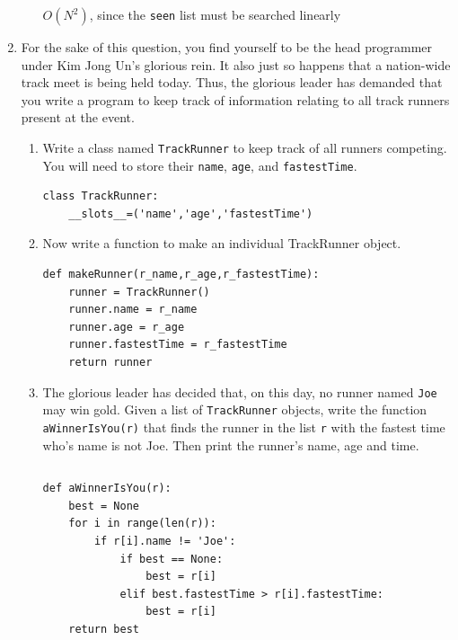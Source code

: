 \documentclass[11pt]{article}
\newenvironment{answer}{\large\lstset{basicstyle=\large}\color{white}}{}
\newenvironment{answer}{\large\lstset{basicstyle=\large}\color{red}}{}
\begin{document}
\begin{enumerate}
\begin{enumerate}
\begin{answer}
$O(N^2)$, since the \texttt{seen} list must be searched linearly
\end{answer}
\end{enumerate}

\newpage
\item For the sake of this question, you find yourself to be the head programmer under Kim Jong Un's glorious rein.
It also just so happens that a nation-wide track meet is being held today. Thus, the glorious leader has demanded that
you write a program to keep track of information relating to all track runners present at the event.

\begin{enumerate}
\item Write a class named \texttt{TrackRunner} to keep track of all runners competing.
You will need to store their \texttt{name}, \texttt{age}, and \texttt{fastestTime}.
\begin{answer}
\begin{lstlisting}
class TrackRunner:
    __slots__=('name','age','fastestTime')

\end{lstlisting}
\end{answer}

\item Now write a function to make an individual TrackRunner object.
\begin{answer}
\begin{lstlisting}
def makeRunner(r_name,r_age,r_fastestTime):
    runner = TrackRunner()
    runner.name = r_name
    runner.age = r_age
    runner.fastestTime = r_fastestTime
    return runner
\end{lstlisting}
\end{answer}

\item The glorious leader has decided that, on this day, no runner named \texttt{Joe} may win
gold. Given a list of \texttt{TrackRunner} objects, write the function \texttt{aWinnerIsYou(r)} that finds the runner in the list \texttt{r} with the fastest time who's name is not Joe. 
Then print the runner's name, age and time.
\begin{lstlisting}

\end{lstlisting}
\begin{answer}
\begin{lstlisting}
def aWinnerIsYou(r):
    best = None
    for i in range(len(r)):
        if r[i].name != 'Joe':
            if best == None:
                best = r[i]
            elif best.fastestTime > r[i].fastestTime:
                best = r[i]
    return best


\end{lstlisting}
\end{answer}
\end{enumerate}
\end{enumerate}
\end{document}
